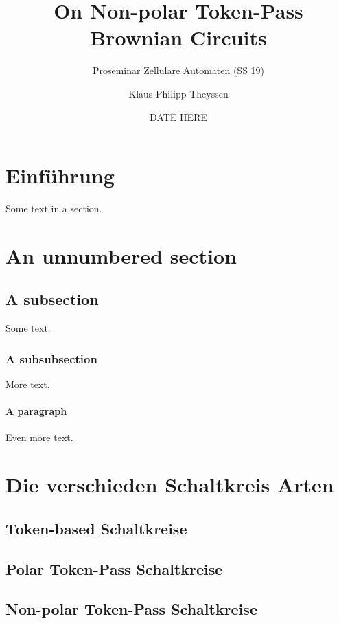 \documentclass[11pt]{scrartcl}
\title{On Non-polar Token-Pass Brownian Circuits} %
\subtitle{Proseminar Zellulare Automaten (SS 19)} %
\author{Klaus Philipp Theyssen} %
\date{DATE HERE} %
\theoremstyle{plain} %
\theoremstyle{definition} %
\theoremstyle{remark} %
\begin{document}



\section{Einführung}
\label{sec:a-section}

Some text in a section.

\section*{An unnumbered section}


\subsection*{A subsection}

Some text.

\subsubsection*{A subsubsection}

More text.

\paragraph*{A paragraph}

Even more text.

\section{Die verschieden Schaltkreis Arten}

\subsection{Token-based Schaltkreise}

\subsection{Polar Token-Pass Schaltkreise}

\subsection{Non-polar Token-Pass Schaltkreise}
\end{document}
